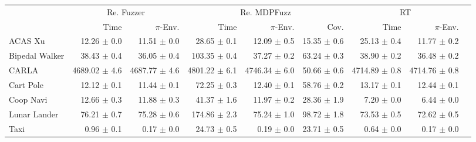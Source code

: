 \begin{tabular}{@{}lrrrrrrrr@{}}
\toprule
 & \multicolumn{2}{c}{Re. Fuzzer}& \multicolumn{3}{c}{Re. MDPFuzz} & \multicolumn{2}{c}{RT} \\ \cmidrule(r){2-3} \cmidrule(lr){4-6} \cmidrule(l){7-8}
 & Time & $\pi$-Env. & Time & $\pi$-Env. & Cov. & Time & $\pi$-Env. \\ \midrule
ACAS Xu & 12.26 $\pm$ 0.0 & 11.51 $\pm$ 0.0 & 28.65 $\pm$ 0.1 & 12.09 $\pm$ 0.5 & 15.35 $\pm$ 0.6 & 25.13 $\pm$ 0.4 & 11.77 $\pm$ 0.2 \\
Bipedal Walker & 38.43 $\pm$ 0.4 & 36.05 $\pm$ 0.4 & 103.35 $\pm$ 0.4 & 37.27 $\pm$ 0.2 & 63.24 $\pm$ 0.3 & 38.90 $\pm$ 0.2 & 36.48 $\pm$ 0.2 \\
CARLA & 4689.02 $\pm$ 4.6 & 4687.77 $\pm$ 4.6 & 4801.22 $\pm$ 6.1 & 4746.34 $\pm$ 6.0 & 50.66 $\pm$ 0.6 & 4714.89 $\pm$ 0.8 & 4714.76 $\pm$ 0.8 \\
Cart Pole & 12.12 $\pm$ 0.1 & 11.44 $\pm$ 0.1 & 72.25 $\pm$ 0.3 & 12.40 $\pm$ 0.1 & 58.76 $\pm$ 0.2 & 13.17 $\pm$ 0.1 & 12.44 $\pm$ 0.1 \\
Coop Navi & 12.66 $\pm$ 0.3 & 11.88 $\pm$ 0.3 & 41.37 $\pm$ 1.6 & 11.97 $\pm$ 0.2 & 28.36 $\pm$ 1.9 & 7.20 $\pm$ 0.0 & 6.44 $\pm$ 0.0 \\
Lunar Lander & 76.21 $\pm$ 0.7 & 75.28 $\pm$ 0.6 & 174.86 $\pm$ 2.3 & 75.24 $\pm$ 1.0 & 98.72 $\pm$ 1.8 & 73.53 $\pm$ 0.5 & 72.62 $\pm$ 0.5 \\
Taxi & 0.96 $\pm$ 0.1 & 0.17 $\pm$ 0.0 & 24.73 $\pm$ 0.5 & 0.19 $\pm$ 0.0 & 23.71 $\pm$ 0.5 & 0.64 $\pm$ 0.0 & 0.17 $\pm$ 0.0 \\ \bottomrule
\end{tabular}
